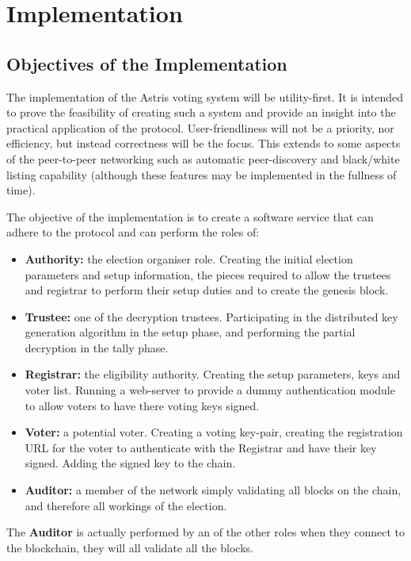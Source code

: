 
\chapter{Implementation}
\label{ch:sw}

\section{Objectives of the Implementation}
\label{ch:sw:objectives}

The implementation of the Astris voting system will be utility-first. It is intended to prove the feasibility of creating such a system and provide an insight into the practical application of the protocol. User-friendliness will not be a priority, nor efficiency, but instead correctness will be the focus. This extends to some aspects of the peer-to-peer networking such as automatic peer-discovery and black/white listing capability (although these features may be implemented in the fullness of time).

The objective of the implementation is to create a software service that can adhere to the protocol and can perform the roles of:

\begin{itemize}
    \item \textbf{Authority:} the election organiser role. Creating the initial election parameters and setup information, the pieces required to allow the trustees and registrar to perform their setup duties and to create the genesis block.
    \item \textbf{Trustee:} one of the decryption trustees. Participating in the distributed key generation algorithm in the setup phase, and performing the partial decryption in the tally phase.
    \item \textbf{Registrar:} the eligibility authority. Creating the setup parameters, keys and voter list. Running a web-server to provide a dummy authentication module to allow voters to have there voting keys signed.
    \item \textbf{Voter:} a potential voter. Creating a voting key-pair, creating the registration URL for the voter to authenticate with the Registrar and have their key signed. Adding the signed key to the chain.
    \item \textbf{Auditor:} a member of the network simply validating all blocks on the chain, and therefore all workings of the election.
\end{itemize}

The \textbf{Auditor} is actually performed by an of the other roles when they connect to the blockchain, they will all validate all the blocks.

